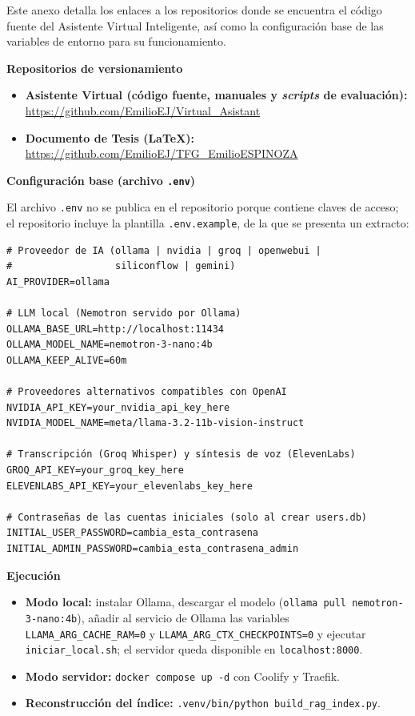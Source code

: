 
Este anexo detalla los enlaces a los repositorios donde se encuentra el código fuente del Asistente Virtual Inteligente, así como la configuración base de las variables de entorno para su funcionamiento.

\textbf{Repositorios de versionamiento}
\begin{itemize}
    \item \textbf{Asistente Virtual (código fuente, manuales y \textit{scripts} de evaluación):} \url{https://github.com/EmilioEJ/Virtual_Asistant}
    \item \textbf{Documento de Tesis (LaTeX):} \url{https://github.com/EmilioEJ/TFG_EmilioESPINOZA}
\end{itemize}

\textbf{Configuración base (archivo \texttt{.env})}

El archivo \texttt{.env} no se publica en el repositorio porque contiene claves de acceso; el repositorio incluye la plantilla \texttt{.env.example}, de la que se presenta un extracto:

\begin{verbatim}
# Proveedor de IA (ollama | nvidia | groq | openwebui |
#                  siliconflow | gemini)
AI_PROVIDER=ollama

# LLM local (Nemotron servido por Ollama)
OLLAMA_BASE_URL=http://localhost:11434
OLLAMA_MODEL_NAME=nemotron-3-nano:4b
OLLAMA_KEEP_ALIVE=60m

# Proveedores alternativos compatibles con OpenAI
NVIDIA_API_KEY=your_nvidia_api_key_here
NVIDIA_MODEL_NAME=meta/llama-3.2-11b-vision-instruct

# Transcripción (Groq Whisper) y síntesis de voz (ElevenLabs)
GROQ_API_KEY=your_groq_key_here
ELEVENLABS_API_KEY=your_elevenlabs_key_here

# Contraseñas de las cuentas iniciales (solo al crear users.db)
INITIAL_USER_PASSWORD=cambia_esta_contrasena
INITIAL_ADMIN_PASSWORD=cambia_esta_contrasena_admin
\end{verbatim}

\textbf{Ejecución}
\begin{itemize}
    \item \textbf{Modo local:} instalar Ollama, descargar el modelo (\texttt{ollama pull nemotron-3-nano:4b}), añadir al servicio de Ollama las variables \texttt{LLAMA\_ARG\_CACHE\_RAM=0} y \texttt{LLAMA\_ARG\_CTX\_CHECKPOINTS=0} y ejecutar \texttt{iniciar\_local.sh}; el servidor queda disponible en \texttt{localhost:8000}.
    \item \textbf{Modo servidor:} \texttt{docker compose up -\allowbreak{}d} con Coolify y Traefik.
    \item \textbf{Reconstrucción del índice:} \texttt{.\allowbreak{}venv/\allowbreak{}bin/\allowbreak{}python build\_\allowbreak{}rag\_\allowbreak{}index.\allowbreak{}py}.
\end{itemize}

